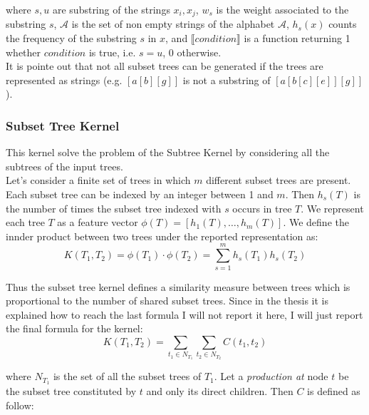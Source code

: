where $s, u$ are substring of the strings $x_i, x_j$, $w_s$ is the weight
associated to the substring $s$, $\mathcal{A}$ is the set of non empty strings
of the alphabet $\mathcal{A}$, $h_s(x)$ counts the frequency of the substring
$s$ in $x$, and $\llbracket condition \rrbracket$ is a function returning 1
whether $condition$ is true, i.e. $s = u$, 0 otherwise.\\
It is pointe out that not all subset trees can be generated if the trees are
represented as strings (e.g. $[a[b][g]]$ is not a substring of
$[a[b[c][e]][g]]$).

\subsubsection{Subset Tree Kernel}
\label{kernel:subset_tree}

This kernel solve the problem of the Subtree Kernel by considering all the
subtrees of the input trees. \\
Let's consider a finite set of trees in which $m$ different subset trees are
present. Each subset tree can be indexed by an integer between 1 and $m$. Then
$h_s(T)$ is the number of times the subset tree indexed with $s$ occurs in 
tree $T$. We represent each tree $T$ as a feature vector $\phi(T) = [h_1(T),
\dots, h_m(T)]$. We define the innder product between two trees under the
reported representation as:
\begin{equation}
	K(T_1, T_2) = \phi(T_1) \cdot \phi(T_2) = \sum_{s=1}^m h_s(T_1) h_s(T_2)
\end{equation}

Thus the subset tree kernel defines a similarity measure between trees which is
proportional to the number of shared subset trees. Since in the thesis it is
explained how to reach the last formula I will not report it here, I will just
report the final formula for the kernel:
\begin{equation}
	K(T_1, T_2) = \sum_{t_1 \in N_{T_1}} \sum_{t_2 \in N_{T_2}}
		C(t_1, t_2)
\end{equation}

where $N_{T_1}$ is the set of all the subset trees of $T_1$. 
Let a \textit{production at} node $t$ be the subset tree constituted by $t$ and
only its direct children. Then $C$ is defined as follow:


